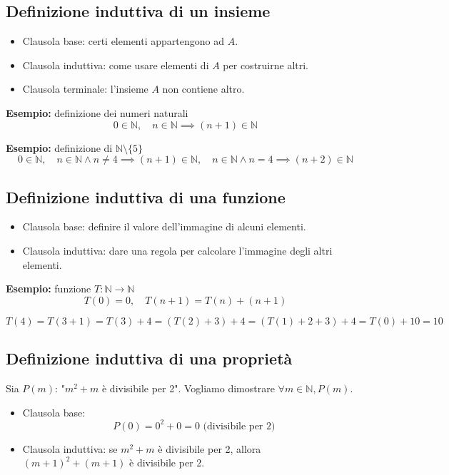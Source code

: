 \documentclass[a4paper,12pt]{article}
\begin{document}
\subsection{Definizione induttiva di un insieme}

\begin{itemize}
    \item Clausola base: certi elementi appartengono ad $A$.
    \item Clausola induttiva: come usare elementi di $A$ per costruirne altri.
    \item Clausola terminale: l'insieme $A$ non contiene altro.
\end{itemize}

\textbf{Esempio:} definizione dei numeri naturali
\[
0 \in \mathbb{N}, \quad n \in \mathbb{N} \implies (n+1) \in \mathbb{N}
\]

\textbf{Esempio:} definizione di $ \mathbb{N} \setminus \{5\} $
\[
0 \in \mathbb{N}, \quad 
n \in \mathbb{N} \wedge n \neq 4 \implies (n+1) \in \mathbb{N}, \quad 
n \in \mathbb{N} \wedge n = 4 \implies (n+2) \in \mathbb{N}
\]

\subsection{Definizione induttiva di una funzione}

\begin{itemize}
    \item Clausola base: definire il valore dell'immagine di alcuni elementi.
    \item Clausola induttiva: dare una regola per calcolare l'immagine degli altri elementi.
\end{itemize}

\textbf{Esempio:} funzione $T: \mathbb{N} \to \mathbb{N}$
\[
T(0) = 0, \quad T(n+1) = T(n) + (n+1)
\]

\[
T(4) = T(3+1) = T(3) + 4 = (T(2) + 3) + 4 = (T(1) + 2 + 3) + 4 = T(0) + 10 = 10
\]

\subsection{Definizione induttiva di una proprietà}

Sia $P(m)$: "$m^2 + m$ è divisibile per 2".  
Vogliamo dimostrare $\forall m \in \mathbb{N}, P(m)$.

\begin{itemize}
    \item Clausola base:
    \[
    P(0) = 0^2 + 0 = 0 \text{ (divisibile per 2)}
    \]
    \item Clausola induttiva: se $m^2 + m$ è divisibile per 2, allora $(m+1)^2 + (m+1)$ è divisibile per 2.
\end{itemize}
\end{document}
